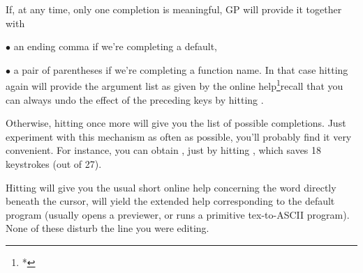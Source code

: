   If, at any time, only one completion is meaningful, GP will provide it
together with

$\bullet$ an ending comma if we're completing a default,

$\bullet$ a pair of parentheses if we're completing a function name. In
that case hitting  again will provide the argument list as given
by the online help\footnote{*}{recall that you can always undo the effect
of the preceding keys by hitting }.

Otherwise, hitting  once more will give you the list of possible
completions. Just experiment with this mechanism as often as possible,
you'll probably find it very convenient. For instance, you can obtain
, just by hitting ,
which saves 18 keystrokes (out of 27).

  Hitting  will give you the usual short online help concerning the
word directly beneath the cursor,  will yield the extended help
corresponding to the  default program (usually opens a 
previewer, or runs a primitive tex-to-ASCII program). None of these disturb
the line you were editing.
\vfill\eject

